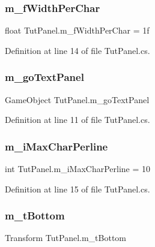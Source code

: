 \subsubsection{\texorpdfstring{m\+\_\+f\+Width\+Per\+Char}{m\_fWidthPerChar}}
{\footnotesize\ttfamily float Tut\+Panel.\+m\+\_\+f\+Width\+Per\+Char = 1f}



Definition at line 14 of file Tut\+Panel.\+cs.

\mbox{\label{class_tut_panel_af626bfe49ba0abaaf934790c86304539}} 
\subsubsection{\texorpdfstring{m\+\_\+go\+Text\+Panel}{m\_goTextPanel}}
{\footnotesize\ttfamily Game\+Object Tut\+Panel.\+m\+\_\+go\+Text\+Panel}



Definition at line 11 of file Tut\+Panel.\+cs.

\mbox{\label{class_tut_panel_aa9b31e4b6bbbb00964c3ac30b33dbec3}} 
\subsubsection{\texorpdfstring{m\+\_\+i\+Max\+Char\+Perline}{m\_iMaxCharPerline}}
{\footnotesize\ttfamily int Tut\+Panel.\+m\+\_\+i\+Max\+Char\+Perline = 10}



Definition at line 15 of file Tut\+Panel.\+cs.

\mbox{\label{class_tut_panel_ac828602c4d402cf02854a331a5709844}} 
\subsubsection{\texorpdfstring{m\+\_\+t\+Bottom}{m\_tBottom}}
{\footnotesize\ttfamily Transform Tut\+Panel.\+m\+\_\+t\+Bottom}



